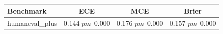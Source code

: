 \begin{tabular}{lccc}
\toprule
Benchmark & ECE & MCE & Brier \\
\midrule
humaneval_plus & 0.144 $\\pm$ 0.000 & 0.176 $\\pm$ 0.000 & 0.157 $\\pm$ 0.000 \\
\bottomrule
\end{tabular}

